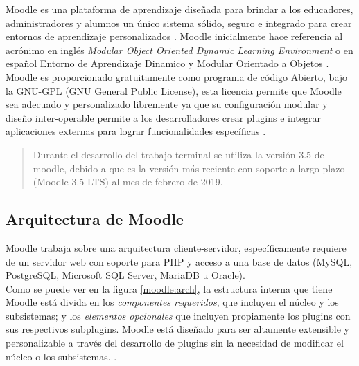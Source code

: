  Moodle es una plataforma de aprendizaje diseñada para brindar a los educadores, administradores
 y alumnos un único sistema sólido, seguro e integrado para crear entornos de aprendizaje personalizados \cite{aboutMoodle}.
 Moodle inicialmente hace referencia al acrónimo en inglés {\it Modular Object Oriented Dynamic
 Learning Environment} o en español Entorno de Aprendizaje Dinamico y Modular Orientado a Objetos \cite{aboutMoodle19}.\\


 \noindent Moodle es proporcionado gratuitamente como programa de código Abierto, bajo la GNU-GPL
 (GNU General Public License), esta licencia permite que Moodle sea adecuado y personalizado libremente
 ya que su configuración modular y diseño inter-operable permite a los desarrolladores crear plugins
 e integrar aplicaciones externas para lograr funcionalidades específicas \cite{aboutMoodle}.


    \begin{quote}
    Durante el desarrollo del trabajo terminal se utiliza la versión 3.5 de moodle,
    debido a que es la versión más reciente con soporte a largo plazo (Moodle 3.5 LTS)
    al mes de febrero de 2019. \cite{moodleHistorial}
    \end{quote}


\subsection{Arquitectura de Moodle}

 Moodle trabaja sobre una arquitectura cliente-servidor, específicamente requiere de un servidor web
 con soporte para PHP y acceso a una base de datos (MySQL, PostgreSQL, Microsoft SQL Server, MariaDB
 u Oracle).\\
    
 \noindent Como se puede ver en la figura \ref{moodle:arch}, la estructura interna que tiene Moodle está
 divida en los {\it componentes requeridos}, que incluyen el núcleo y los subsistemas; y los {\it elementos
 opcionales} que incluyen propiamente los plugins con sus respectivos subplugins. Moodle está diseñado para
 ser altamente extensible y personalizable a través del desarrollo de plugins sin la necesidad de modificar
 el núcleo o los subsistemas. \cite{moodleArch}.

